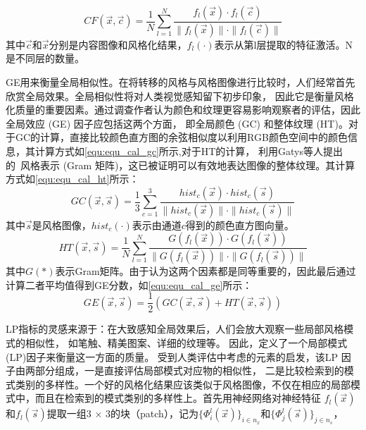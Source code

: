 \begin{equation}
    \label{equ:equ_cal_cf}
    CF(\vec{x},\vec{c})=\frac1N\sum_{l=1}^N\frac{f_l(\vec{x})\cdot f_l(\vec{c})}{\parallel f_l(\vec{x})\parallel\cdot\parallel f_l(\vec{c})\parallel}
\end{equation}
其中$\vec{c}$和$\vec{x}$分别是内容图像和风格化结果，\(f_l(\cdot)\)表示从第l层提取的特征激活。N是不同层的数量。
\par GE用来衡量全局相似性。在将转移的风格与风格图像进行比较时，人们经常首先欣赏全局效果。全局相似性将对人类视觉感知留下初步印象，
因此它是衡量风格化质量的重要因素。通过调查作者认为颜色和纹理更容易影响观察者的评估，因此全局效应 (GE) 因子应包括这两个方面，
即全局颜色 (GC) 和整体纹理 (HT)。对于GC的计算，直接比较颜色直方图的余弦相似度以利用RGB颜色空间中的颜色信息，其计算方式如\autoref{equ:equ_cal_gc}所示,对于HT的计算，
利用Gatys等人提出的~\cite{gatys2016image,gatys2017controlling}风格表示 (Gram 矩阵)，这已被证明可以有效地表达图像的整体纹理。其计算方式如\autoref{equ:equ_cal_ht}所示：
\begin{equation}
    \label{equ:equ_cal_gc}
    GC(\vec{x},\vec{s})=\frac13\sum_{c=1}^3\frac{hist_c(\vec{x})\cdot hist_c(\vec{s})}{\parallel hist_c(\vec{x})\parallel\cdot\parallel hist_c(\vec{s})\parallel}
\end{equation}
其中$\vec{s}$是风格图像，\(hist_c(\cdot)\)表示由通道$c$得到的颜色直方图向量。
\begin{equation}
    \label{equ:equ_cal_ht}
    HT(\vec{x},\vec{s})=\frac1N\sum_{l=1}^N\frac{G(f_l(\vec{x}))\cdot G(f_l(\vec{s}))}{\parallel G(f_l(\vec{x}))\parallel\cdot\parallel G(f_l(\vec{s}))\parallel}
\end{equation}
其中$G(*)$表示Gram矩阵。由于认为这两个因素都是同等重要的，因此最后通过计算二者平均值得到GE分数，如\autoref{equ:equ_cal_ge}所示：
\begin{equation}
    \label{equ:equ_cal_ge}
    GE(\vec{x},\vec{s})=\frac12(GC(\vec{x},\vec{s})+HT(\vec{x},\vec{s}))
\end{equation}
\par LP指标的灵感来源于：在大致感知全局效果后，人们会放大观察一些局部风格模式的相似性，
如笔触、精美图案、详细的纹理等。
因此，定义了一个局部模式(LP)因子来衡量这一方面的质量。
受到人类评估中考虑的元素的启发，该LP 因子由两部分组成，一是直接评估局部模式对应物的相似性，
二是比较检索到的模式类别的多样性。一个好的风格化结果应该类似于风格图像，不仅在相应的局部模式中，而且在检索到的模式类别的多样性上。首先用神经网络对神经特征
\(f_l(\vec{x})\)和\(f_l(\vec{s})\)提取一组3 × 3的块（patch），记为\(\{\Phi_i^l(\vec{x})\}_{i\in n_x}\)和\(\{\Phi_j^l(\vec{s})\}_{j\in n_s}\)，

